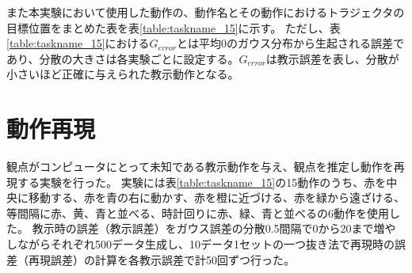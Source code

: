 また本実験において使用した動作の、動作名とその動作におけるトラジェクタの目標位置をまとめた表を表\ref{table:taskname_15}に示す。
ただし、表\ref{table:taskname_15}における$G_{error}$とは平均0のガウス分布から生起される誤差であり、分散の大きさは各実験ごとに設定する。$G_{error}$は教示誤差を表し、分散が小さいほど正確に与えられた教示動作となる。


\section{動作再現}

観点がコンピュータにとって未知である教示動作を与え、観点を推定し動作を再現する実験を行った。
実験には表\ref{table:taskname_15}の15動作のうち、赤を中央に移動する、赤を青の右に動かす、赤を橙に近づける、赤を緑から遠ざける、等間隔に赤、黄、青と並べる、時計回りに赤、緑、青と並べるの6動作を使用した。
教示時の誤差（教示誤差）をガウス誤差の分散0.5間隔で0から20まで増やしながらそれぞれ500データ生成し、10データ1セットの一つ抜き法で再現時の誤差（再現誤差）の計算を各教示誤差で計50回ずつ行った。

